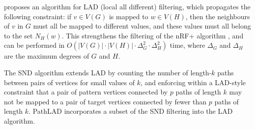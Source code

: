 
\citet{DBLP:journals/ai/Solnon10} proposes an algorithm for LAD (local all
different) filtering, which propagates the following constraint: if $v \in
V(G)$ is mapped to $w \in V(H)$, then the neighbours of $v$ in $G$ must all be
mapped to different values, and these values must all belong to the set
$N_H(w)$.  This strengthens the filtering of the nRF+ algorithm
\citep{DBLP:journals/mscs/LarrosaV02}, and can be performed in $O(|V(G)| \cdot
|V(H)| \cdot \Delta_G^2 \cdot \Delta_H^2)$ time, where $\Delta_G$ and
$\Delta_H$ are the maximum degrees of $G$ and $H$.

The SND algorithm \citep{DBLP:conf/cp/AudemardLMGP14} extends LAD by counting
the number of length-$k$ paths between pairs of vertices for small values of
$k$, and enforcing within a LAD-style constraint that a pair of pattern
vertices connected by $p$ paths of length $k$ may not be mapped to a pair of
target vertices connected by fewer than $p$ paths of length $k$.  PathLAD
\citep{DBLP:conf/lion/KotthoffMS16} incorporates a subset of the SND filtering
into the LAD algorithm.

